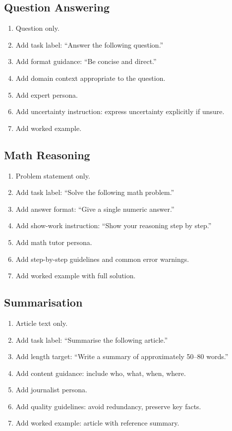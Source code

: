\subsection{Question Answering}
\begin{enumerate}
  \item Question only.
  \item Add task label: ``Answer the following question.''
  \item Add format guidance: ``Be concise and direct.''
  \item Add domain context appropriate to the question.
  \item Add expert persona.
  \item Add uncertainty instruction: express uncertainty explicitly if unsure.
  \item Add worked example.
\end{enumerate}

\subsection{Math Reasoning}
\begin{enumerate}
  \item Problem statement only.
  \item Add task label: ``Solve the following math problem.''
  \item Add answer format: ``Give a single numeric answer.''
  \item Add show-work instruction: ``Show your reasoning step by step.''
  \item Add math tutor persona.
  \item Add step-by-step guidelines and common error warnings.
  \item Add worked example with full solution.
\end{enumerate}

\subsection{Summarisation}
\begin{enumerate}
  \item Article text only.
  \item Add task label: ``Summarise the following article.''
  \item Add length target: ``Write a summary of approximately 50--80 words.''
  \item Add content guidance: include who, what, when, where.
  \item Add journalist persona.
  \item Add quality guidelines: avoid redundancy, preserve key facts.
  \item Add worked example: article with reference summary.
\end{enumerate}

